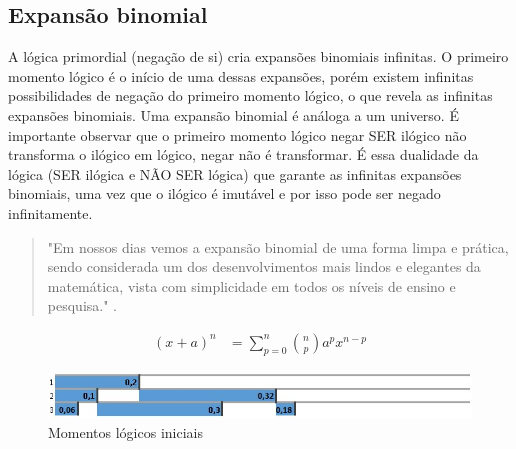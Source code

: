 \subsection{Expansão binomial}
A lógica primordial (negação de si) cria expansões binomiais infinitas. O primeiro momento lógico é o início de uma dessas expansões, porém existem infinitas possibilidades de negação do primeiro momento lógico, o que revela as infinitas expansões binomiais. Uma expansão binomial é análoga a um universo. É importante observar que o primeiro momento lógico negar SER ilógico não transforma o ilógico em lógico, negar não é transformar. É essa dualidade da lógica (SER ilógica e NÃO SER lógica) que garante as infinitas expansões binomiais, uma vez que o ilógico é imutável e por isso pode ser negado infinitamente.

\begin{quote}
"Em nossos dias vemos a expansão binomial de uma forma limpa e prática, sendo considerada um dos desenvolvimentos mais lindos e elegantes da matemática, vista com simplicidade em todos os níveis de ensino e pesquisa." \cite{ufpr_binomio_newton}.
\end{quote}
\begin{align*}
(x+a)^n &= \sum_{p=0}^{n}\binom{n}{p} a^p x^{n-p}
\end{align*}

\begin{figure}[H]
\caption{Momentos lógicos iniciais}
\label{fig:third_logical_moment}
\centering
\includegraphics[scale=.85]{sections/images/third_logical_moment.jpg}
\end{figure}

